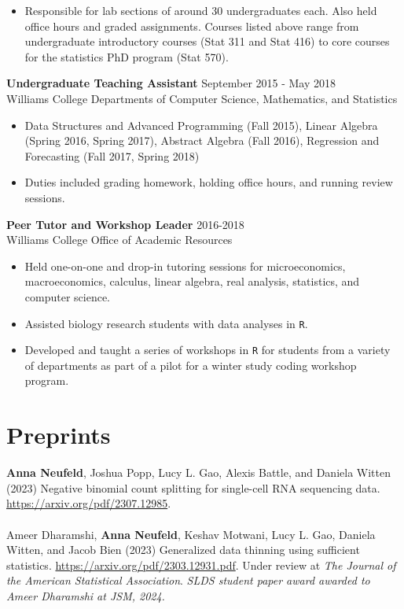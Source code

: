 \documentclass[margin, 10pt]{res}
\begin{document}
\begin{resume}
\begin{itemize}
\item Responsible for lab sections of around 30 undergraduates each. Also held office hours and graded assignments. Courses listed above range from undergraduate introductory courses (Stat 311 and Stat 416) to core courses for the statistics PhD program (Stat 570). 
\end{itemize}
{\textbf{Undergraduate Teaching Assistant}} \hfill September 2015 - May 2018 \\
Williams College Departments of Computer Science, Mathematics, and Statistics
\begin{itemize}
\item Data Structures and Advanced Programming (Fall 2015), Linear Algebra (Spring 2016, Spring 2017), Abstract Algebra (Fall 2016), Regression and Forecasting (Fall 2017, Spring 2018)
\item Duties included grading homework, holding office hours, and running review sessions. 
\end{itemize}
{\textbf{Peer Tutor and Workshop Leader}} \hfill 2016-2018 \\
Williams College Office of Academic Resources
\begin{itemize}
\item Held one-on-one and drop-in tutoring sessions for microeconomics, macroeconomics, calculus, linear algebra, real analysis, statistics, and computer science.  
\item Assisted biology research students with data analyses in \texttt{R}. 
\item Developed and taught a series of workshops in \texttt{R} for students from a variety of departments as part of a pilot for a winter study coding workshop program.  
\end{itemize}

\section{Preprints} 
\textbf{Anna Neufeld}, Joshua Popp, Lucy L. Gao, Alexis Battle, and Daniela Witten (2023) Negative binomial count splitting for single-cell RNA sequencing data. \\ \href{https://arxiv.org/pdf/2307.12985}{https://arxiv.org/pdf/2307.12985}. \\
\\
Ameer Dharamshi, \textbf{Anna Neufeld}, Keshav Motwani, Lucy L. Gao, Daniela Witten, and Jacob Bien (2023) Generalized data thinning using sufficient statistics. \href{https://arxiv.org/pdf/2303.12931.pdf}{https://arxiv.org/pdf/2303.12931.pdf}.  Under review at \emph{The Journal of the American Statistical Association}. \emph{SLDS student paper award awarded to Ameer Dharamshi at JSM, 2024.}  

\end{resume}
\end{document}
